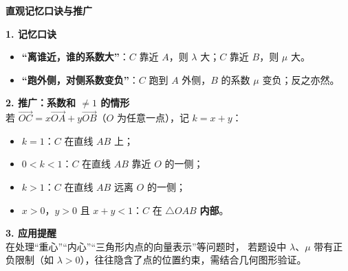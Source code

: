 \documentclass[UTF8,10pt,aspectratio=169]{ctexbeamer}
\begin{document}
	\begin{frame}
		\begin{center}
			{\Large \textbf{直观记忆口诀与推广}}
		\end{center}
		\vspace{0.3cm}
		
		\textbf{1. 记忆口诀}
		\begin{itemize}
			\item \textbf{“离谁近，谁的系数大”}：$C$ 靠近 $A$，则 $\lambda$ 大；$C$ 靠近 $B$，则 $\mu$ 大。
			\item \textbf{“跑外侧，对侧系数变负”}：$C$ 跑到 $A$ 外侧，$B$ 的系数 $\mu$ 变负；反之亦然。
		\end{itemize}
		
		\pause
		\vspace{0.4cm}
		\textbf{2. 推广：系数和 $\neq 1$ 的情形} \\
		若 $\overrightarrow{OC} = x\overrightarrow{OA} + y\overrightarrow{OB}$（$O$ 为任意一点），记 $k = x + y$：
		\begin{itemize}
			\item $k = 1$：$C$ 在直线 $AB$ 上；
			\item $0 < k < 1$：$C$ 在直线 $AB$ 靠近 $O$ 的一侧；
			\item $k > 1$：$C$ 在直线 $AB$ 远离 $O$ 的一侧；
			\item $x > 0$，$y > 0$ 且 $x + y < 1$：$C$ 在 $\triangle OAB$ \textbf{内部}。
		\end{itemize}
		
		\pause
		\vspace{0.3cm}
		\textbf{3. 应用提醒} \\
		在处理“重心”“内心”“三角形内点的向量表示”等问题时，
		若题设中 $\lambda$、$\mu$ 带有正负限制（如 $\lambda > 0$），往往隐含了点的位置约束，需结合几何图形验证。
	\end{frame}
	
\end{document}

